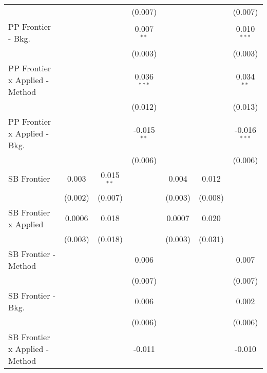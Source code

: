 \begin{tabular}{lcccccc}
                                  &                &                & (0.007)       &                &                & (0.007)\\   
   PP Frontier - Bkg.             &                &                & 0.007$^{**}$  &                &                & 0.010$^{***}$\\   
                                  &                &                & (0.003)       &                &                & (0.003)\\   
   PP Frontier x Applied - Method &                &                & 0.036$^{***}$ &                &                & 0.034$^{**}$\\   
                                  &                &                & (0.012)       &                &                & (0.013)\\   
   PP Frontier x Applied - Bkg.   &                &                & -0.015$^{**}$ &                &                & -0.016$^{***}$\\   
                                  &                &                & (0.006)       &                &                & (0.006)\\   
   SB Frontier                    & 0.003          & 0.015$^{**}$   &               & 0.004          & 0.012          &   \\   
                                  & (0.002)        & (0.007)        &               & (0.003)        & (0.008)        &   \\   
   SB Frontier x Applied          & 0.0006         & 0.018          &               & 0.0007         & 0.020          &   \\   
                                  & (0.003)        & (0.018)        &               & (0.003)        & (0.031)        &   \\   
   SB Frontier - Method           &                &                & 0.006         &                &                & 0.007\\   
                                  &                &                & (0.007)       &                &                & (0.007)\\   
   SB Frontier - Bkg.             &                &                & 0.006         &                &                & 0.002\\   
                                  &                &                & (0.006)       &                &                & (0.006)\\   
   SB Frontier x Applied - Method &                &                & -0.011        &                &                & -0.010\\   

\end{tabular}
